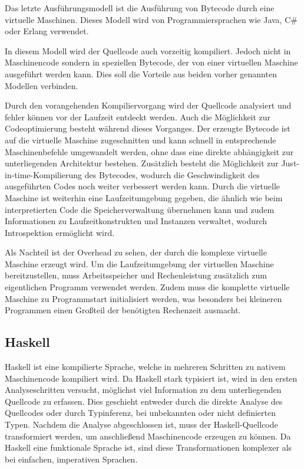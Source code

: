 \documentclass[11pt, parskip=half]{scrartcl}       %
\begin{document}
Das letzte Ausführungsmodell ist die Ausführung von Bytecode durch eine virtuelle Maschinen.
Dieses Modell wird von Programmiersprachen wie Java, C\# oder Erlang verwendet.

In diesem Modell wird der Quellcode auch vorzeitig kompiliert.
Jedoch nicht in Maschinencode sondern in speziellen Bytecode, der von einer virtuellen Maschine ausgeführt werden kann.
Dies soll die Vorteile aus beiden vorher genannten Modellen verbinden.

Durch den vorangehenden Kompiliervorgang wird der Quellcode analysiert und fehler können vor der Laufzeit entdeckt werden.
Auch die Möglichkeit zur Codeoptimierung besteht während dieses Vorganges.
Der erzeugte Bytecode ist auf die virtuelle Maschine zugeschnitten und kann schnell in entsprechende Maschinenbefehle umgewandelt werden, ohne dass eine direkte abhängigkeit zur unterliegenden Architektur bestehen.
Zusätzlich besteht die Möglichkeit zur Just-in-time-Kompilierung des Bytecodes, wodurch die Geschwindigkeit des ausgeführten Codes noch weiter verbessert werden kann.
Durch die virtuelle Maschine ist weiterhin eine Laufzeitumgebung gegeben, die ähnlich wie beim interpretierten Code die Speicherverwaltung übernehmen kann und zudem Informationen zu Laufzeitkonstrukten und Instanzen verwaltet, wodurch Introspektion ermöglicht wird.

Als Nachteil ist der Overhead zu sehen, der durch die komplexe virtuelle Maschine erzeugt wird.
Um die Laufzeitumgebung der virtuellen Maschine bereitzustellen, muss Arbeitsspeicher und Rechenleistung zusätzlich zum eigentlichen Programm verwendet werden.
Zudem muss die komplette virtuelle Maschine zu Programmstart initialisiert werden, was besonders bei kleineren Programmen einen Großteil der benötigten Rechenzeit ausmacht.


\subsection{Haskell}

Haskell ist eine kompilierte Sprache, welche in mehreren Schritten zu nativem Maschinencode kompiliert wird.
Da Haskell stark typisiert ist, wird in den ersten Analyseschritten versucht, möglichst viel Information zu dem unterliegenden Quellcode zu erfassen.
Dies geschieht entweder durch die direkte Analyse des Quellcodes oder durch Typinferenz, bei unbekannten oder nicht definierten Typen.
Nachdem die Analyse abgeschlossen ist, muss der Haskell-Quellcode transformiert werden, um anschließend Maschinencode erzeugen zu können.
Da Haskell eine funktionale Sprache ist, sind diese Transformationen komplexer als bei einfachen, imperativen Sprachen.
\end{document}
